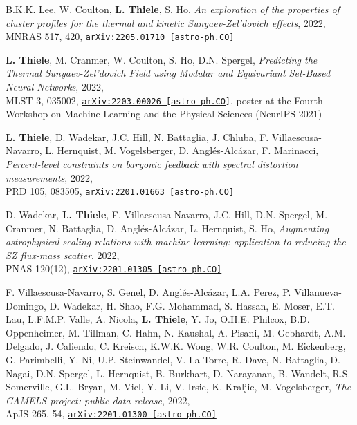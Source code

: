 \begin{minipage}{\textwidth}
B.K.K. Lee, W. Coulton, {\bf L. Thiele}, S. Ho,
\emph{An exploration of the properties of cluster profiles for the thermal and kinetic Sunyaev-Zel'dovich effects}, 2022,\\
MNRAS 517, 420,
\href{https://arxiv.org/abs/2205.01710}{\mbox{\texttt{arXiv:2205.01710 [astro-ph.CO]}}}
\end{minipage}

\begin{minipage}{\textwidth}
{\bf L. Thiele}, M. Cranmer, W. Coulton, S. Ho, D.N. Spergel,
\emph{Predicting the Thermal Sunyaev-Zel'dovich Field using Modular and Equivariant Set-Based Neural Networks}, 2022,\\
MLST 3, 035002,
\href{https://arxiv.org/abs/2203.00026}{\mbox{\texttt{arXiv:2203.00026 [astro-ph.CO]}}},
poster at the Fourth Workshop on Machine Learning and the Physical Sciences (NeurIPS 2021)
\end{minipage}

\begin{minipage}{\textwidth}
{\bf L. Thiele}, D. Wadekar, J.C. Hill, N. Battaglia, J. Chluba, F. Villaescusa-Navarro, L. Hernquist, M. Vogelsberger, D. Angl\'es-Alc\'azar, F. Marinacci,
\emph{Percent-level constraints on baryonic feedback with spectral distortion measurements}, 2022,\\
PRD 105, 083505,
\href{https://arxiv.org/abs/2201.01663}{\mbox{\texttt{arXiv:2201.01663 [astro-ph.CO]}}}
\end{minipage}

\begin{minipage}{\textwidth}
D. Wadekar, {\bf L. Thiele}, F. Villaescusa-Navarro, J.C. Hill, D.N. Spergel, M. Cranmer, N. Battaglia, D. Angl\'es-Alc\'azar, L. Hernquist, S. Ho,
\emph{Augmenting astrophysical scaling relations with machine learning: application to reducing the SZ flux-mass scatter}, 2022,\\
PNAS 120(12),
\href{https://arxiv.org/abs/2201.01305}{\mbox{\texttt{arXiv:2201.01305 [astro-ph.CO]}}}
\end{minipage}

\begin{minipage}{\textwidth}
F. Villaescusa-Navarro, S. Genel, D. Angl\'es-Alc\'azar, L.A. Perez, P. Villanueva-Domingo, D. Wadekar, H. Shao, F.G. Mohammad, S. Hassan, E. Moser, E.T. Lau, L.F.M.P. Valle, A. Nicola, {\bf L. Thiele}, Y. Jo, O.H.E. Philcox, B.D. Oppenheimer, M. Tillman, C. Hahn, N. Kaushal, A. Pisani, M. Gebhardt, A.M. Delgado, J. Caliendo, C. Kreisch, K.W.K. Wong, W.R. Coulton, M. Eickenberg, G. Parimbelli, Y. Ni, U.P. Steinwandel, V. La Torre, R. Dave, N. Battaglia, D. Nagai, D.N. Spergel, L. Hernquist, B. Burkhart, D. Narayanan, B. Wandelt, R.S. Somerville, G.L. Bryan, M. Viel, Y. Li, V. Irsic, K. Kraljic, M. Vogelsberger,
\emph{The CAMELS project: public data release}, 2022,\\
ApJS 265, 54,
\href{https://arxiv.org/abs/2201.01300}{\mbox{\texttt{arXiv:2201.01300 [astro-ph.CO]}}}
\end{minipage}

